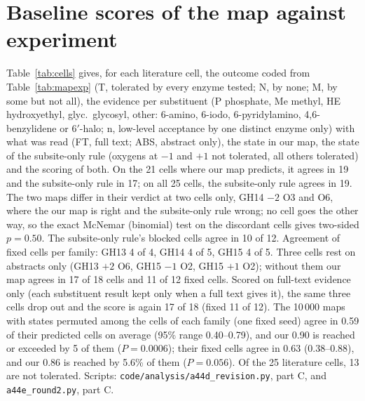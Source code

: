 \documentclass[preprint,12pt]{elsarticle}
\begin{document}
\section{Baseline scores of the map against experiment}\label{sec:baseline}
Table~\ref{tab:cells} gives, for each literature cell, the outcome coded from Table~\ref{tab:mapexp} (T, tolerated
by every enzyme tested; N, by none; M, by some but not all), the evidence per substituent (P phosphate, Me methyl, HE
hydroxyethyl, glyc.\ glycosyl, other: 6-amino, 6-iodo, 6-pyridylamino, 4,6-benzylidene or 6$'$-halo; n, low-level
acceptance by one distinct enzyme only) with what was read (FT, full text; ABS, abstract only), the state in our map,
the state of the subsite-only rule (oxygens at $-1$ and $+1$ not tolerated, all others tolerated) and the scoring of both.
On the 21 cells where our map predicts, it agrees in 19 and the subsite-only rule in 17; on all 25 cells, the
subsite-only rule agrees in 19. The two maps differ in their verdict at two cells only, GH14 $-2$ O3 and O6, where the
our map is right and the subsite-only rule wrong; no cell goes the other way, so the exact McNemar (binomial) test on
the discordant cells gives two-sided $p = 0.50$. The subsite-only rule's blocked cells agree in 10 of 12. Agreement of fixed cells per
family: GH13 4 of 4, GH14 4 of 5, GH15 4 of 5. Three cells rest on abstracts only (GH13 $+2$ O6, GH15 $-1$ O2, GH15
$+1$ O2); without them our map agrees in 17 of 18 cells and 11 of 12 fixed cells. Scored on full-text evidence
only (each substituent result kept only when a full text gives it), the same three cells drop out and the score is
again 17 of 18 (fixed 11 of 12). The 10\,000 maps with states permuted among the cells of each family (one fixed seed)
agree in 0.59 of their predicted cells on average (95\% range 0.40--0.79), and our 0.90 is reached or exceeded by 5
of them ($P = 0.0006$); their fixed cells agree in 0.63 (0.38--0.88), and our 0.86 is reached by 5.6\% of them
($P = 0.056$). Of
the 25 literature cells, 13 are not tolerated. Scripts: \texttt{code/analysis/a44d\_revision.py}, part C, and
\texttt{a44e\_round2.py}, part C.
\end{document}
